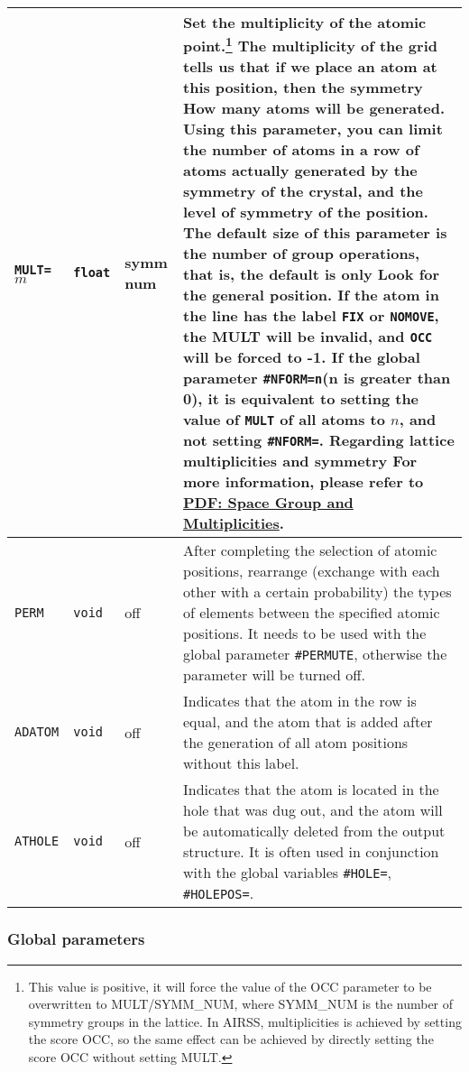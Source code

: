 \documentclass[a4paper, 10pt]{article}
\begin{document}
\begin{center}
\begin{longtable}{m{10em}|m{4em}<{\centering}|m{3em}<{\centering}|m{15em}}
\midrule
\verb|MULT=|\(m\) & \verb|float| & symm num & Set the multiplicity of the atomic point.\footnote{This value is positive, it will force the value of the OCC parameter to be overwritten to MULT/SYMM\_NUM, where SYMM\_NUM is the number of symmetry groups in the lattice. In AIRSS, multiplicities is achieved by setting the score OCC, so the same effect can be achieved by directly setting the score OCC without setting MULT.} The multiplicity of the grid tells us that if we place an atom at this position, then the symmetry How many atoms will be generated. Using this parameter, you can limit the number of atoms in a row of atoms actually generated by the symmetry of the crystal, and the level of symmetry of the position. The default size of this parameter is the number of group operations, that is, the default is only Look for the general position. If the atom in the line has the label \verb|FIX| or \verb|NOMOVE|, the MULT will be invalid, and \verb|OCC| will be forced to -1. If the global parameter \verb|#NFORM=n|(n is greater than 0), it is equivalent to setting the value of \verb|MULT| of all atoms to \(n\), and not setting \verb|#NFORM=|. Regarding lattice multiplicities and symmetry For more information, please refer to \href{http://folk.ntnu.no/yingday/NilsYD/PhaseStructure/001Space_Groups.pdf}{PDF: Space Group and Multiplicities}.\\
\midrule
\verb|PERM| & \verb|void| & off & After completing the selection of atomic positions, rearrange (exchange with each other with a certain probability) the types of elements between the specified atomic positions. It needs to be used with the global parameter \verb|#PERMUTE|, otherwise the parameter will be turned off.\\
\midrule
\verb|ADATOM| & \verb|void| & off & Indicates that the atom in the row is equal, and the atom that is added after the generation of all atom positions without this label.\\
\midrule
\verb|ATHOLE| & \verb|void| & off & Indicates that the atom is located in the hole that was dug out, and the atom will be automatically deleted from the output structure. It is often used in conjunction with the global variables \verb|#HOLE=|, \verb|#HOLEPOS=|.\\
\bottomrule
\end{longtable}
\end{center}

\subsubsection{Global parameters}
\end{document}
